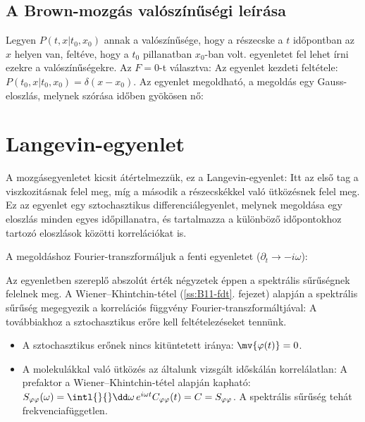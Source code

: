   \subsection{A Brown-mozgás valószínűségi leírása}
   
   Legyen $P(t,x|t_0,x_0)$ annak a valószínűsége, hogy a részecske a $t$ időpontban az $x$ helyen van, feltéve, hogy a $t_0$ pillanatban $x_0$-ban volt.  egyenletet fel lehet írni ezekre a valószínűségekre.
   Az $F=0$-t választva:
   Az egyenlet kezdeti feltétele: $P(t_0,x|t_0,x_0)=\delta(x-x_0)$.
   Az egyenlet megoldható, a megoldás egy Gauss-eloszlás, melynek szórása időben gyökösen nő:
   
 \section{Langevin-egyenlet}
  
  A mozgásegyenletet kicsit átértelmezzük, ez a Langevin-egyenlet:
  Itt az első tag a viszkozitásnak felel meg, míg a második a részecskékkel való ütközésnek felel meg.
   Ez az egyenlet egy sztochasztikus differenciálegyenlet, melynek megoldása egy eloszlás minden egyes időpillanatra, és tartalmazza a különböző időpontokhoz tartozó eloszlások közötti korrelációkat is. 
  
  A megoldáshoz Fourier-transzformáljuk a fenti egyenletet ($\partial_t\to -i\omega$):
  
  Az egyenletben szereplő abszolút érték négyzetek éppen a spektrális sűrűségnek felelnek meg.
   A Wiener--Khintchin-tétel (\ref{ss:B11-fdt}. fejezet) alapján a spektrális sűrűség megegyezik a korrelációs függvény Fourier-transzformáltjával:
  A továbbiakhoz a sztochasztikus erőre kell feltételezéseket tennünk. 
  \begin{itemize}
   \item A sztochasztikus erőnek nincs kitüntetett iránya: $\mv{\varphi(t)}=0$.
   \item A molekulákkal való ütközés az általunk vizsgált időskálán korrelálatlan: 
   A prefaktor a Wiener--Khintchin-tétel alapján kapható: $S_{\varphi\varphi}(\omega)=\intl{}{}\dd\omega\,e^{i\omega t}C_{\varphi\varphi}(t)=C=S_{\varphi\varphi}$.
   A spektrális sűrűség tehát frekvenciafüggetlen.
  \end{itemize}
  
